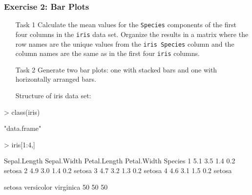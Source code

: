 \documentclass{beamer}
\newcommand{\Rfunction}[1]{{\texttt{#1}}}
\begin{document}
\begin{frame}[containsverbatim]  
	\frametitle{Exercise 2: Bar Plots}
\scriptsize
\begin{itemize}
        \item[Task 1] Calculate the mean values for the \Rfunction{Species} components of the first four columns in the \Rfunction{iris} data set. Organize the results in a matrix where the row names are the unique values from the \Rfunction{iris Species} column and the column names are the same as in the first four \Rfunction{iris} columns. 
        \item[Task 2] Generate two bar plots: one with stacked bars and one with horizontally arranged bars. 
        \item[]\hspace{-1.1cm} Structure of iris data set:
\end{itemize}
\begin{Schunk}
\begin{Sinput}
> class(iris)
\end{Sinput}
\begin{Soutput}
[1] "data.frame"
\end{Soutput}
\begin{Sinput}
> iris[1:4,]
\end{Sinput}
\begin{Soutput}
  Sepal.Length Sepal.Width Petal.Length Petal.Width Species
1          5.1         3.5          1.4         0.2  setosa
2          4.9         3.0          1.4         0.2  setosa
3          4.7         3.2          1.3         0.2  setosa
4          4.6         3.1          1.5         0.2  setosa
\end{Soutput}
\begin{Soutput}
    setosa versicolor  virginica 
        50         50         50 
\end{Soutput}
\end{Schunk}
\end{frame}
\end{document}
